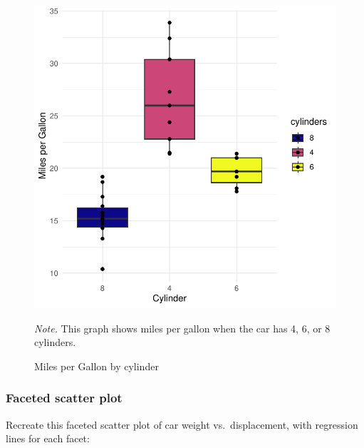 \documentclass[
  man,
  floatsintext,
  longtable,
  nolmodern,
  notxfonts,
  notimes,
  colorlinks=true,linkcolor=blue,citecolor=blue,urlcolor=blue]{apa7}
\begin{document}
\begin{figure}[H]

{\caption{{Miles per Gallon by cylinder}{\label{fig-plot4-boxplot}}}}

\includegraphics{data-visualization_files/figure-pdf/fig-plot4-boxplot-1.pdf}

{\noindent \emph{Note.} This graph shows miles per gallon when the car
has 4, 6, or 8 cylinders.}

\end{figure}

\subsubsection{Faceted scatter plot}\label{faceted-scatter-plot}

Recreate this faceted scatter plot of car weight vs.~displacement, with
regression lines for each facet:
\end{document}
